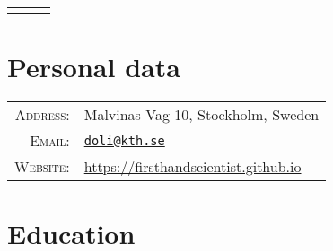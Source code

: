 \documentclass[a4paper,10pt]{article}
\begin{document}
\pagestyle{empty}


\begin{center}
  \begin{tabular}{lcr}
    \par{\centering{\Huge Dong Liu}\bigskip\par} & & %
  \end{tabular}
\end{center}

\section{Personal data}

\begin{tabular}{rl}
  \textsc{Address:} & Malvinas Vag 10, Stockholm, Sweden \\
  \textsc{Email:} & \href{mailto:doli@kth.se}{\nolinkurl{doli@kth.se}} \\
  \textsc{Website:} & \href{https://firsthandscientist.github.io}{https://firsthandscientist.github.io}\\
\end{tabular}


\section{Education}
\end{document}
